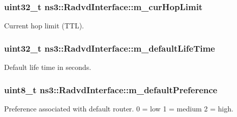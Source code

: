 \subsubsection[{\texorpdfstring{m\+\_\+cur\+Hop\+Limit}{m_curHopLimit}}]{\setlength{\rightskip}{0pt plus 5cm}uint32\+\_\+t ns3\+::\+Radvd\+Interface\+::m\+\_\+cur\+Hop\+Limit\hspace{0.3cm}{\ttfamily [private]}}\hypertarget{classns3_1_1RadvdInterface_ad6f1a73f0e78b7f57c935b1ccffc5adc}{}\label{classns3_1_1RadvdInterface_ad6f1a73f0e78b7f57c935b1ccffc5adc}


Current hop limit (T\+TL). 

\subsubsection[{\texorpdfstring{m\+\_\+default\+Life\+Time}{m_defaultLifeTime}}]{\setlength{\rightskip}{0pt plus 5cm}uint32\+\_\+t ns3\+::\+Radvd\+Interface\+::m\+\_\+default\+Life\+Time\hspace{0.3cm}{\ttfamily [private]}}\hypertarget{classns3_1_1RadvdInterface_a30cef69bc3ca9c49d5768dc6e4f25006}{}\label{classns3_1_1RadvdInterface_a30cef69bc3ca9c49d5768dc6e4f25006}


Default life time in seconds. 

\subsubsection[{\texorpdfstring{m\+\_\+default\+Preference}{m_defaultPreference}}]{\setlength{\rightskip}{0pt plus 5cm}uint8\+\_\+t ns3\+::\+Radvd\+Interface\+::m\+\_\+default\+Preference\hspace{0.3cm}{\ttfamily [private]}}\hypertarget{classns3_1_1RadvdInterface_a5e5b744252884bfda1b660fbe84acd6a}{}\label{classns3_1_1RadvdInterface_a5e5b744252884bfda1b660fbe84acd6a}


Preference associated with default router. 0 = low 1 = medium 2 = high. 

